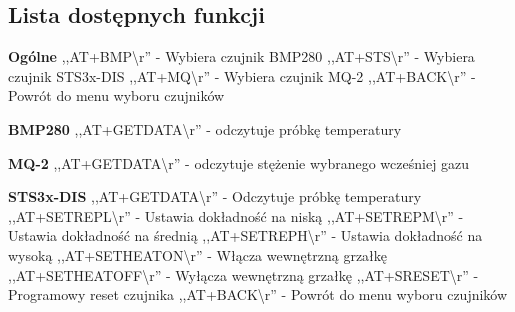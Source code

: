 \subsection{Lista dostępnych funkcji}
\textbf{Ogólne}\newline
   ,,AT+BMP\textbackslash r'' - Wybiera czujnik BMP280\newline
   ,,AT+STS\textbackslash r'' - Wybiera czujnik STS3x-DIS\newline
   ,,AT+MQ\textbackslash r'' - Wybiera czujnik MQ-2\newline
   ,,AT+BACK\textbackslash r'' - Powrót do menu wyboru czujników\newline

\textbf{BMP280}\newline
   ,,AT+GETDATA\textbackslash r'' - odczytuje próbkę temperatury

\textbf{MQ-2}\newline
   ,,AT+GETDATA\textbackslash r'' - odczytuje stężenie wybranego wcześniej gazu

\textbf{STS3x-DIS}\newline
   ,,AT+GETDATA\textbackslash r'' - Odczytuje próbkę temperatury\newline
   ,,AT+SETREPL\textbackslash r'' - Ustawia dokładność na niską \newline
   ,,AT+SETREPM\textbackslash r'' - Ustawia dokładność na średnią\newline
   ,,AT+SETREPH\textbackslash r'' - Ustawia dokładność na wysoką\newline
   ,,AT+SETHEATON\textbackslash r'' - Włącza wewnętrzną grzałkę\newline
   ,,AT+SETHEATOFF\textbackslash r'' - Wyłącza wewnętrzną grzałkę\newline
   ,,AT+SRESET\textbackslash r'' - Programowy reset czujnika\newline
   ,,AT+BACK\textbackslash r'' - Powrót do menu wyboru czujników\newline

